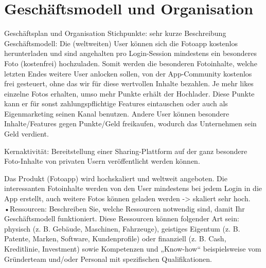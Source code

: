 \chapter{Geschäftsmodell und Organisation}

Geschäftsplan und Organisation Stichpunkte:
sehr kurze Beschreibung Geschäftsmodell:
Die (weltweiten) User können sich die Fotoapp kostenlos herunterladen und sind angehalten pro Login-Session mindestens ein
besonderes Foto (kostenfrei) hochzuladen. Somit werden die besonderen Fotoinhalte, welche letzten Endes weitere User anlocken sollen, von der App-Community kostenlos frei gesteuert,
ohne das wir für diese wertvollen Inhalte bezahlen. Je mehr likes einzelne Fotos erhalten, umso mehr Punkte erhält der Hochlader.
Diese Punkte kann er für sonst zahlungspflichtige Features eintauschen oder auch als Eigenmarketing seinen Kanal benutzen. Andere User können besondere Inhalte/Features gegen Punkte/Geld freikaufen,
wodurch das Unternehmen sein Geld verdient.

Kernaktivität: Bereitstellung einer Sharing-Plattform auf der ganz besondere Foto-Inhalte von privaten Usern veröffentlicht werden können.


Das Produkt (Fotoapp) wird hochskaliert und weltweit angeboten. Die interessanten Fotoinhalte werden von den User mindestens bei jedem
Login in die App erstellt, auch weitere Fotos können geladen werden -> skaliert sehr hoch. 
•Ressourcen: Beschreiben Sie, welche Ressourcen notwendig sind, damit Ihr Geschäftsmodell funktioniert. 
Diese Ressourcen können folgender Art sein: physisch (z. B. Gebäude, Maschinen, Fahrzeuge), geistiges Eigentum
 (z. B. Patente, Marken, Software, Kundenprofile) oder finanziell (z. B. Cash, Kreditlinie, Investment) sowie 
 Kompetenzen und „Know-how“ beispielsweise vom Gründerteam und/oder Personal mit spezifischen Qualifikationen.
 
